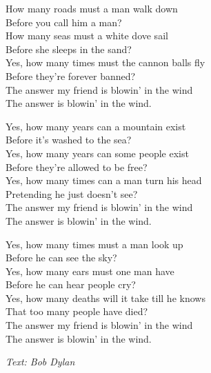 \vspace{10pt}
How many roads must a man walk down\\
Before you call him a man?\\
How many seas must a white dove sail\\
Before she sleeps in the sand?\\
Yes, how many times must the cannon balls fly\\
Before they're forever banned?\\
The answer my friend is blowin' in the wind\\
The answer is blowin' in the wind.\par
\vspace{10pt}
Yes, how many years can a mountain exist\\
Before it's washed to the sea?\\
Yes, how many years can some people exist\\
Before they're allowed to be free?\\
Yes, how many times can a man turn his head\\
Pretending he just doesn't see?\\
The answer my friend is blowin' in the wind\\
The answer is blowin' in the wind.\par
\vspace{10pt}
Yes, how many times must a man look up\\
Before he can see the sky?\\
Yes, how many ears must one man have\\
Before he can hear people cry?\\
Yes, how many deaths will it take till he knows\\
That too many people have died?\\
The answer my friend is blowin' in the wind\\
The answer is blowin' in the wind.\par
\vspace{10pt}
{\footnotesize\textit{Text: Bob Dylan}}
